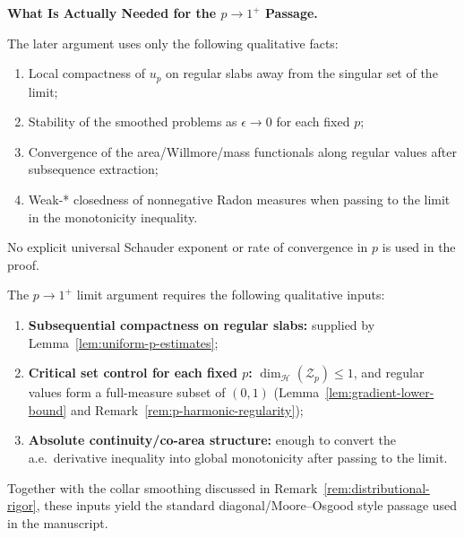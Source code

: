 \begin{remark}
\textbf{What Is Actually Needed for the $p \to 1^+$ Passage.}

The later argument uses only the following qualitative facts:
\begin{enumerate}
    \item Local compactness of $u_p$ on regular slabs away from the singular set of the limit;
    \item Stability of the smoothed problems as $\epsilon \to 0$ for each fixed $p$;
    \item Convergence of the area/Willmore/mass functionals along regular values after subsequence extraction;
    \item Weak-* closedness of nonnegative Radon measures when passing to the limit in the monotonicity inequality.
\end{enumerate}
No explicit universal Schauder exponent or rate of convergence in $p$ is used in the proof.
\begin{remark}\label{rem:uniform-p-summary}
The $p \to 1^+$ limit argument requires the following qualitative inputs:
\begin{enumerate}
    \item \textbf{Subsequential compactness on regular slabs:} supplied by Lemma~\ref{lem:uniform-p-estimates};
    \item \textbf{Critical set control for each fixed $p$:} $\dim_{\mathcal{H}}(\mathcal{Z}_p) \leq 1$, and regular values form a full-measure subset of $(0,1)$ (Lemma~\ref{lem:gradient-lower-bound} and Remark~\ref{rem:p-harmonic-regularity});
    \item \textbf{Absolute continuity/co-area structure:} enough to convert the a.e.\ derivative inequality into global monotonicity after passing to the limit.
\end{enumerate}
Together with the collar smoothing discussed in Remark~\ref{rem:distributional-rigor}, these inputs yield the standard diagonal/Moore--Osgood style passage used in the manuscript.
\end{remark}


\end{remark}

